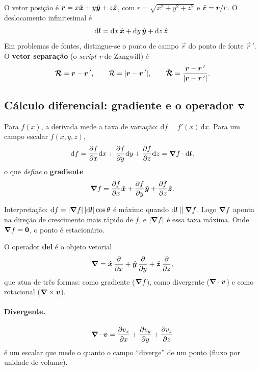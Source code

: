 O vetor posição é $\bm{r}=x\hat{\bm{x}}+y\hat{\bm{y}}+z\hat{\bm{z}}$, com
$r=\sqrt{x^2+y^2+z^2}$ e $\hat{\bm{r}}=\bm{r}/r$. O deslocamento infinitesimal é
\begin{equation}
  \mathrm{d}\bm{l}=\mathrm{d}x\,\hat{\bm{x}}+\mathrm{d}y\,\hat{\bm{y}}+\mathrm{d}z\,\hat{\bm{z}}.
\end{equation}
Em problemas de fontes, distingue-se o ponto de campo $\vec{r}$ do ponto de fonte
$\vec{r}\,'$. O \textbf{vetor separação} (o \emph{script-r} de Zangwill) é
\begin{equation}
  \bm{\mathcal{R}}=\bm{r}-\bm{r}\,',\qquad
  \mathcal{R}=|\bm{r}-\bm{r}\,'|,\qquad
  \hat{\bm{\mathcal{R}}}=\frac{\bm{r}-\bm{r}\,'}{|\bm{r}-\bm{r}\,'|}.
\end{equation}

\subsection{Cálculo diferencial: gradiente e o operador \texorpdfstring{$\bm{\nabla}$}{nabla}}

Para $f(x)$, a derivada mede a taxa de variação: $\mathrm{d}f=f'(x)\,\mathrm{d}x$.
Para um campo escalar $f(x,y,z)$,
\begin{equation}
  \mathrm{d}f=\dfrac{\partial f}{\partial x}\mathrm{d}x+\dfrac{\partial f}{\partial y}\mathrm{d}y+\dfrac{\partial f}{\partial z}\mathrm{d}z
           =\bm{\nabla} f\cdot\mathrm{d}\bm{l},
\end{equation}
o que \emph{define} o \textbf{gradiente}
\begin{equation}
  \bm{\nabla} f=\dfrac{\partial f}{\partial x}\hat{\bm{x}}+\dfrac{\partial f}{\partial y}\hat{\bm{y}}+\dfrac{\partial f}{\partial z}\hat{\bm{z}}.
\end{equation}
\begin{nota}
Interpretação: $\mathrm{d}f=|\bm{\nabla} f|\,|\mathrm{d}\bm{l}|\cos\theta$ é máximo
quando $\mathrm{d}\bm{l}\parallel\bm{\nabla} f$. Logo $\bm{\nabla} f$ aponta na direção de
crescimento mais rápido de $f$, e $|\bm{\nabla} f|$ é essa taxa máxima. Onde
$\bm{\nabla} f=\bm{0}$, o ponto é estacionário.
\end{nota}
O operador \textbf{del} é o objeto vetorial
\begin{equation}
  \bm{\nabla}=\hat{\bm{x}}\,\dfrac{\partial }{\partial x}+\hat{\bm{y}}\,\dfrac{\partial }{\partial y}+\hat{\bm{z}}\,\dfrac{\partial }{\partial z},
\end{equation}
que atua de três formas: como gradiente ($\bm{\nabla} f$), como divergente
($\bm{\nabla}\cdot\bm{v}$) e como rotacional ($\bm{\nabla}\times\bm{v}$).

\paragraph{Divergente.}
\begin{equation}
  \bm{\nabla}\cdot\bm{v}=\dfrac{\partial v_x}{\partial x}+\dfrac{\partial v_y}{\partial y}+\dfrac{\partial v_z}{\partial z}
\end{equation}
é um escalar que mede o quanto o campo ``diverge'' de um ponto (fluxo por unidade
de volume).

